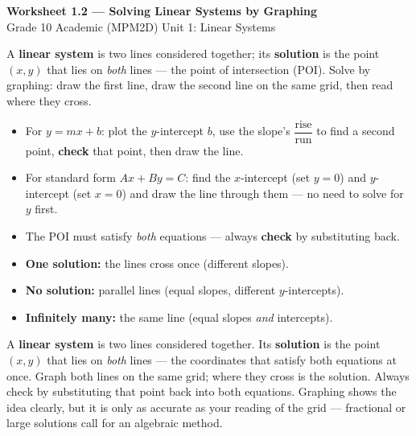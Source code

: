 \documentclass[11pt]{article}
\begin{document}
\begin{center}
{\LARGE\bfseries\color{titleblue}Worksheet 1.2 --- Solving Linear Systems by Graphing}\\[2pt]
{\small Grade 10 Academic (MPM2D) \textperiodcentered{} Unit 1: Linear Systems}
\end{center}

\begin{ideabox}
A \textbf{linear system} is two lines considered together; its \textbf{solution} is the point $(x,y)$ that lies on \emph{both} lines --- the point of intersection (POI). Solve by graphing: draw the first line, draw the second line on the same grid, then read where they cross.
\begin{itemize}[leftmargin=*,itemsep=2pt]
  \item For $y=mx+b$: plot the $y$-intercept $b$, use the slope's $\dfrac{\text{rise}}{\text{run}}$ to find a second point, \textbf{check} that point, then draw the line.
  \item For standard form $Ax+By=C$: find the $x$-intercept (set $y=0$) and $y$-intercept (set $x=0$) and draw the line through them --- no need to solve for $y$ first.
  \item The POI must satisfy \emph{both} equations --- always \textbf{check} by substituting back.
  \item \textbf{One solution:} the lines cross once (different slopes).
  \item \textbf{No solution:} parallel lines (equal slopes, different $y$-intercepts).
  \item \textbf{Infinitely many:} the same line (equal slopes \emph{and} intercepts).
\end{itemize}
\end{ideabox}

\begin{learnbox}
A \textbf{linear system} is two lines considered together. Its \textbf{solution} is the point $(x,y)$ that lies on \emph{both} lines — the coordinates that satisfy both equations at once.
Graph both lines on the same grid; where they cross is the solution. Always check by substituting that point back into both equations.
Graphing shows the idea clearly, but it is only as accurate as your reading of the grid — fractional or large solutions call for an algebraic method.
\end{learnbox}

\end{document}

